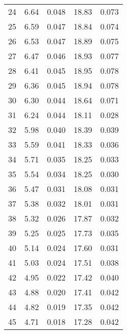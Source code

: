 \begin{table}
\begin{tabular}{c|ll|ll}
24 & 6.64 & 0.048 & 18.83 & 0.073 \\
25 & 6.59 & 0.047 & 18.84 & 0.074 \\
26 & 6.53 & 0.047 & 18.89 & 0.075 \\
27 & 6.47 & 0.046 & 18.93 & 0.077 \\
28 & 6.41 & 0.045 & 18.95 & 0.078 \\
29 & 6.36 & 0.045 & 18.94 & 0.078 \\
30 & 6.30 & 0.044 & 18.64 & 0.071 \\
31 & 6.24 & 0.044 & 18.11 & 0.028 \\
32 & 5.98 & 0.040 & 18.39 & 0.039 \\
33 & 5.59 & 0.041 & 18.33 & 0.036 \\
34 & 5.71 & 0.035 & 18.25 & 0.033 \\
35 & 5.54 & 0.034 & 18.25 & 0.030 \\
36 & 5.47 & 0.031 & 18.08 & 0.031 \\
37 & 5.38 & 0.032 & 18.01 & 0.031 \\
38 & 5.32 & 0.026 & 17.87 & 0.032 \\
39 & 5.25 & 0.025 & 17.73 & 0.035 \\
40 & 5.14 & 0.024 & 17.60 & 0.031 \\
41 & 5.03 & 0.024 & 17.51 & 0.038 \\
42 & 4.95 & 0.022 & 17.42 & 0.040 \\
43 & 4.88 & 0.020 & 17.41 & 0.042 \\
44 & 4.82 & 0.019 & 17.35 & 0.042 \\
45 & 4.71 & 0.018 & 17.28 & 0.042 \\
               \hline
        \end{tabular}
    \end{table}
    \clearpage

